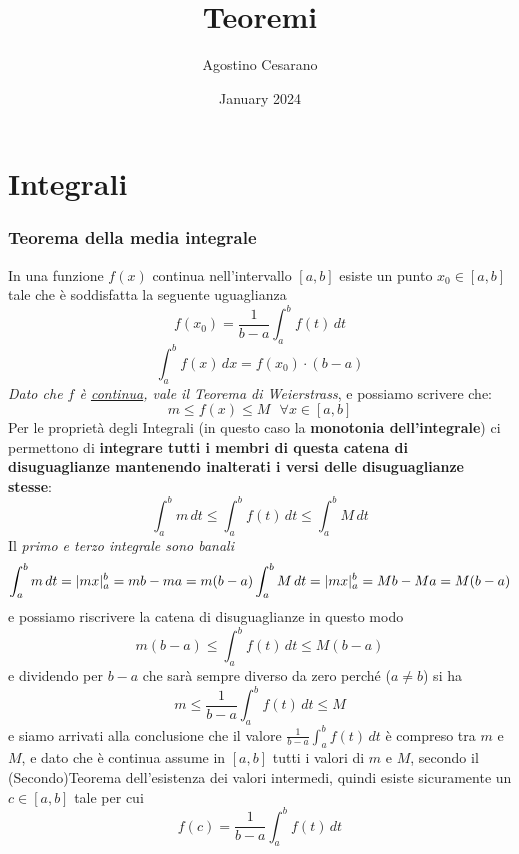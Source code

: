 \documentclass{article}
\title{Teoremi}
\author{Agostino Cesarano}
\date{January 2024}
\begin{document}
\maketitle
{}

\setcounter{part}{3}
\part{Integrali}
\section{Teorema della media integrale}
In una funzione $f(x)$ continua nell'intervallo $[a,b]$ esiste un punto $x_{0}
    \in [a,b]$ tale che è soddisfatta la seguente uguaglianza $$f(x_{0}) =
    \frac{1}{b-a} \int_{a}^{b} f(t) \, dt $$ $$\int_{a}^b f(x) \, dx = f(x_{0})
    \cdot (b-a)$$ \textit{Dato che $f$ è \underline{continua}, vale il Teorema di
    Weierstrass}, e possiamo scrivere che: $$ m \leq f(x) \leq M \text{ } \forall x
    \in [a,b] $$ Per le proprietà degli Integrali (in questo caso la \textbf{monotonia
dell'integrale}) ci permettono di \textbf{integrare tutti i membri di questa catena
di disuguaglianze mantenendo inalterati i versi delle disuguaglianze stesse}:
$$ \int_{a}^{b} m \, dt \leq \int_{a}^{b} f(t) \, dt \leq \int_{a}^{b} M \, dt
$$ Il \textit{primo e terzo integrale sono banali} $$ \int_{a}^{b} m \, dt =
    |mx|_{a}^b = mb - ma = m(b-a) \\ \int_{a}^{b} M \, dt = |mx|_{a}^b = Mb - Ma =
    M(b-a) $$ e possiamo riscrivere la catena di disuguaglianze in questo modo $$
    m(b-a) \leq \int_{a}^{b} f(t) \, dt \leq M(b-a) $$ e dividendo per $b-a$ che
sarà sempre diverso da zero perché ($a \neq b$) si ha $$ m \leq \frac{1}{b-a}
    \int_{a}^b f(t) \, dt \leq M $$ e siamo arrivati alla conclusione che il valore
$\frac{1}{b-a} \int_{a}^b f(t) \, dt$ è compreso tra $m$ e $M$, e dato che è
continua assume in $[a,b]$ tutti i valori di $m$ e $M$, secondo il
(Secondo)Teorema dell'esistenza dei valori intermedi, quindi esiste sicuramente un $c \in [a,b]$ tale per cui $$
    f(c) = \frac{1}{b-a} \int_{a}^b f(t) \, dt $$
\end{document}
